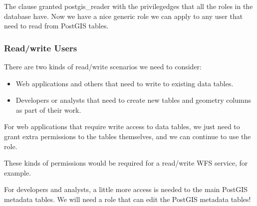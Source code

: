 \documentclass[a4paper,11pt,english]{sphinxmanual}
\begin{document}
The  clause granted postgis\_reader with the privilegedges that all the roles in the database have. Now we have a nice generic  role we can apply to any user that need to read from PostGIS tables.


\subsubsection{Read/write Users}
\label{\detokenize{maintenance:read-write-users}}
There are two kinds of read/write scenarios we need to consider:
\begin{itemize}
\item {} 
Web applications and others that need to write to existing data tables.

\item {} 
Developers or analysts that need to create new tables and geometry columns as part of their work.

\end{itemize}

For web applications that require write access to data tables, we just need to grant extra permissions to the tables themselves, and we can continue to use the  role.

\begin{sphinxVerbatim}[commandchars=\\\{\}]
     
\end{sphinxVerbatim}

These kinds of permissions would be required for a read/write WFS service, for example.

For developers and analysts, a little more access is needed to the main PostGIS metadata tables.  We will need a  role that can edit the PostGIS metadata tables!

\begin{sphinxVerbatim}[commandchars=\\\{\}]
  

   

     

   
\end{sphinxVerbatim}
\end{document}
